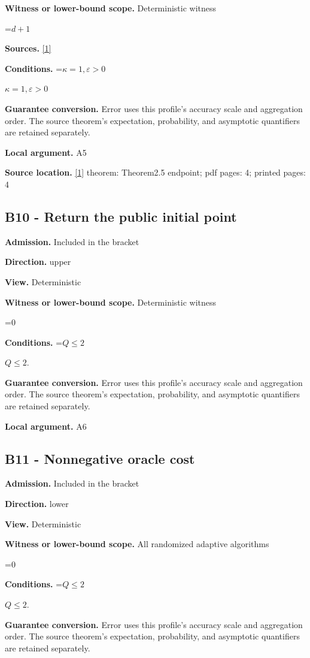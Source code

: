 \documentclass[10pt,a4paper]{article}
\newcommand{\AtlasMath}[1]{\par\begingroup\centering\setbox0=\hbox{$\displaystyle #1$}\ifdim\wd0>1.4\linewidth\typeout{ATLAS WIDE FORMULA: \the\wd0}\fi\ifdim\wd0>\linewidth\resizebox{\linewidth}{!}{\box0}\else\box0\fi\par\endgroup}
\newcommand{\AtlasInlineMath}[1]{\begingroup\setbox0=\hbox{$#1$}\ifdim\wd0>.4\linewidth\endgroup\AtlasMath{#1}\else\endgroup$#1$\fi}
\begin{document}
\textbf{Witness or lower-bound scope.} Deterministic witness

\AtlasMath{d+1}
\textbf{Sources.} \href{https://arxiv.org/html/2610.00345v1}{[1]}

\textbf{Conditions.} \AtlasInlineMath{\kappa=1,\varepsilon>0}

\textbf{Guarantee conversion.} Error uses this profile's accuracy scale and aggregation order. The source theorem's expectation, probability, and asymptotic quantifiers are retained separately.

\textbf{Local argument.} A5

\textbf{Source location.} \href{https://arxiv.org/html/2610.00345v1}{[1]} theorem: Theorem2.5 endpoint; pdf pages: 4; printed pages: 4

\subsection{B10 - Return the public initial point}
\textbf{Admission.} Included in the bracket

\textbf{Direction.} upper

\textbf{View.} Deterministic

\textbf{Witness or lower-bound scope.} Deterministic witness

\AtlasMath{0}
\textbf{Conditions.} \AtlasInlineMath{Q\le2}.

\textbf{Guarantee conversion.} Error uses this profile's accuracy scale and aggregation order. The source theorem's expectation, probability, and asymptotic quantifiers are retained separately.

\textbf{Local argument.} A6

\subsection{B11 - Nonnegative oracle cost}
\textbf{Admission.} Included in the bracket

\textbf{Direction.} lower

\textbf{View.} Deterministic

\textbf{Witness or lower-bound scope.} All randomized adaptive algorithms

\AtlasMath{0}
\textbf{Conditions.} \AtlasInlineMath{Q\le2}.

\textbf{Guarantee conversion.} Error uses this profile's accuracy scale and aggregation order. The source theorem's expectation, probability, and asymptotic quantifiers are retained separately.
\end{document}
